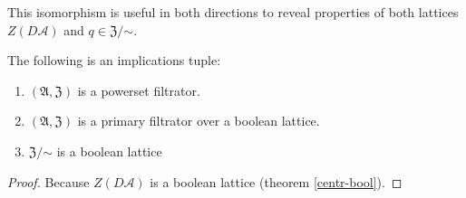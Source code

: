 This isomorphism is useful in both directions to reveal properties
of both lattices $Z(D\mathcal{A})$ and $q\in\mathfrak{Z}/\mathord\sim$.
\begin{cor}
\label{frac-is-bool}The following is an implications tuple:
\begin{enumerate}
\item $(\mathfrak{A},\mathfrak{Z})$ is a powerset filtrator.
\item $(\mathfrak{A},\mathfrak{Z})$ is a primary filtrator over a boolean
lattice.
\item $\mathfrak{Z}/\mathord\sim$ is a boolean lattice
\end{enumerate}
\end{cor}
\begin{proof}
Because $Z(D\mathcal{A})$ is a boolean lattice (theorem \ref{centr-bool}).
\end{proof}

